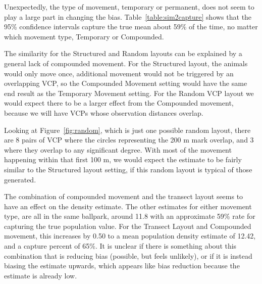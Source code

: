 \documentclass[12pt]{article}
\begin{document}
Unexpectedly, the type of movement, temporary or permanent, does not seem to play a large part in changing the bias. Table~\ref{table:sim2capture} shows that the 95\% confidence intervals \parencite{quang1993} capture the true mean about 59\% of the time, no matter which movement type, Temporary or Compounded.

The similarity for the Structured and Random layouts can be explained by a general lack of compounded movement. For the Structured layout, the animals would only move once, additional movement would not be triggered by an overlapping VCP, so the Compounded Movement setting would have the same end result as the Temporary Movement setting. For the Random VCP layout we would expect there to be a larger effect from the Compounded movement, because we will have VCPs whose observation distances overlap. 

Looking at Figure~\ref{fig:random}, which is just one possible random layout, there are 8 pairs of VCP where the circles representing the 200 m mark overlap, and 3 where they overlap to any significant degree. With most of the movement happening within that first 100 m, we would expect the estimate to be fairly similar to the Structured layout setting, if this random layout is typical of those generated. 

The combination of compounded movement and the transect layout seems to have an effect on the density estimate. The other estimates for either movement type, are all in the same ballpark, around 11.8 with an approximate 59\% rate for capturing the true population value. For the Transect Layout and Compounded movement, this increases by 0.50 to a mean population density estimate of 12.42, and a capture percent of 65\%. It is unclear if there is something about this combination that is reducing bias (possible, but feels unlikely), or if it is instead biasing the estimate upwards, which appears like bias reduction because the estimate is already low.
\end{document}
